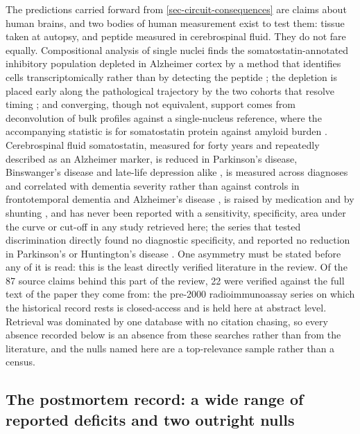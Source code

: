 \documentclass[11pt]{article}
\begin{document}
The predictions carried forward from \ref{sec-circuit-consequences} are claims about human brains, and two bodies of human measurement exist to test them: tissue taken at autopsy, and peptide measured in cerebrospinal fluid. They do not fare equally. Compositional analysis of single nuclei finds the somatostatin-annotated inhibitory population depleted in Alzheimer cortex by a method that identifies cells transcriptomically rather than by detecting the peptide \citep{Mathys2023,Gabitto2024}; the depletion is placed early along the pathological trajectory by the two cohorts that resolve timing \citep{Gabitto2024,Travaglini2026}; and converging, though not equivalent, support comes from deconvolution of bulk profiles against a single-nucleus reference, where the accompanying statistic is for somatostatin protein against amyloid burden \citep{Cain2023}. Cerebrospinal fluid somatostatin, measured for forty years and repeatedly described as an Alzheimer marker, is reduced in Parkinson's disease, Binswanger's disease and late-life depression alike \citep{Dupont1982,Sunderland1987,Strittmatter1996b,Masson1990}, is measured across diagnoses and correlated with dementia severity rather than against controls in frontotemporal dementia and Alzheimer's disease \citep{Minthon1997}, is raised by medication and by shunting \citep{Strittmatter1997,Poca2001}, and has never been reported with a sensitivity, specificity, area under the curve or cut-off in any study retrieved here; the series that tested discrimination directly found no diagnostic specificity, and reported no reduction in Parkinson's or Huntington's disease \citep{Beal1986e}. One asymmetry must be stated before any of it is read: this is the least directly verified literature in the review. Of the 87 source claims behind this part of the review, 22 were verified against the full text of the paper they come from: the pre-2000 radioimmunoassay series on which the historical record rests is closed-access and is held here at abstract level. Retrieval was dominated by one database with no citation chasing, so every absence recorded below is an absence from these searches rather than from the literature, and the nulls named here are a top-relevance sample rather than a census.

\subsection{The postmortem record: a wide range of reported deficits and two outright nulls}
\label{sec-09-postmortem-record}
\end{document}
